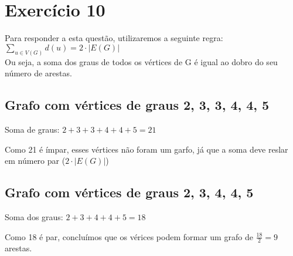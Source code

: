 \section{Exercício 10} 

Para responder a esta questão, utilizaremos a seguinte regra: \\

$\sum_{u \in V(G)} d(u) = 2 \cdot |E(G)|$ \\

\noindent
Ou seja, a soma dos graus de todos os vértices de G é igual ao dobro do seu número de arestas. \\


\subsection{Grafo com vértices de graus 2, 3, 3, 4, 4, 5}

Soma de graus: $2 + 3 + 3 + 4 + 4 + 5 = 21$

\noindent
Como 21 é ímpar, esses vértices não foram um garfo, já que a soma deve reslar em número par ($2 \cdot |E(G)|$)



\subsection{Grafo com vértices de graus 2, 3, 4, 4, 5}


Soma dos graus: $2 + 3 + 4 + 4 + 5 = 18$

\noindent
Como 18 é par, concluímos que os vérices podem formar um grafo de $\frac{18}{2} = 9$ arestas.
